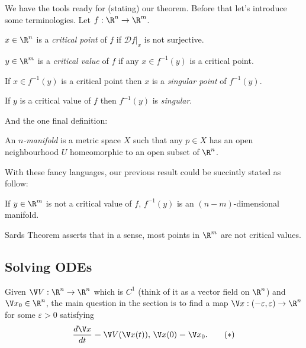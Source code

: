 \documentclass[a4paper]{article}
\newcommand*{\D}{\mathcal{D}}
\theoremstyle{definition}
\begin{document}
We have the tools ready for (stating) our theorem. Before that let's introduce some terminologies. Let \(f: \R^n \to \R^m\).

\begin{definition}
  \(x \in \R^n\) is a \emph{critical point} of \(f\) if \(\D f|_x\) is not surjective.
\end{definition}

\begin{definition}
  \(y \in \R^m\) is a \emph{critical value} of \(f\) if any \(x \in f^{-1}(y)\) is a critical point.
\end{definition}

\begin{definition}[Singular]
  If \(x \in f^{-1}(y)\) is a critical point then \(x\) is a \emph{singular point} of \(f^{-1}(y)\).

  If \(y\) is a critical value of \(f\) then \(f^{-1}(y)\) is \emph{singular}.
\end{definition}

And the one final definition:

\begin{definition}[Manifold]
  An \emph{\(n\)-manifold} is a metric space \(X\) such that any \(p \in X\) has an open neighbourhood \(U\) homeomorphic to an open subset of \(\R^n\).
\end{definition}

With these fancy languages, our previous result could be succintly stated as follow:

\begin{theorem}
  \label{thm:implicit}
  If \(y \in \R^m\) is not a critical value of \(f\), \(f^{-1}(y)\) is an \((n - m)\)-dimensional manifold.
\end{theorem}

\begin{remark}
  Sards Theorem asserts that in a sense, most points in \(\R^m\) are not critical values.
\end{remark}

\subsection{Solving ODEs}

Given \(\V V: \R^n \to \R^n\) which is \(C^1\) (think of it as a vector field on \(\R^n\)) and \(\V x_0 \in \R^n\), the main question in the section is to find a map \(\V x: (-\varepsilon, \varepsilon) \to \R^n\) for some \(\varepsilon > 0\) satisfying
\begin{equation*}
  \label{eqn:ODE}
  \frac{d \V x}{dt} = \V V(\V x(t)), \, \V x(0) = \V x_0.
  \tag{\(\ast\)}
\end{equation*}
\end{document}
